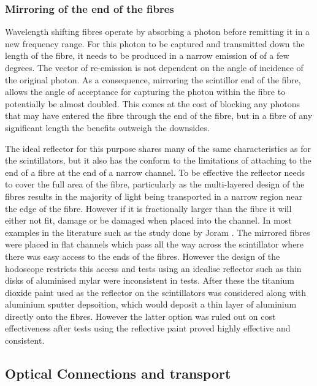 \subsubsection{Mirroring of the end of the fibres}

Wavelength shifting fibres operate by absorbing a photon before remitting it in a new frequency range. For this photon to be captured and transmitted down the length of the fibre, it needs to be produced in a narrow emission of of a few degrees. The vector of re-emission is not dependent on the angle of incidence of the original photon. As a consequence, mirroring the scintillor end of the fibre, allows the angle of acceptance for capturing the photon within the fibre to potentially be almost doubled. This comes at the cost of blocking any photons that may have entered the fibre through the end of the fibre, but in a fibre of any significant length the benefits outweigh the downsides.

The ideal reflector for this purpose shares many of the same characteristics as for the scintillators, but it also has the conform to the limitations of attaching to the end of a fibre at the end of a narrow channel.  To be effective the reflector needs to cover the full area of the fibre, particularly as the multi-layered design of the fibres results in the majority of light being transported in a narrow region near the edge of the fibre. However if it is fractionally larger than the fibre it will either not fit, damage or be damaged when placed into the channel. In most examples in the literature such as the study done by Joram \cite{joram2014mirroring}. The mirrored fibres were placed in flat channels which pass all the way across the scintillator where there was easy access to the ends of the fibres. However the design of the hodoscope restricts this access and tests using an idealise reflector such as thin disks of aluminised mylar were inconsistent in tests. After these the titanium dioxide paint used as the reflector on the scintillators was considered along with aluminium sputter depsoition, which would deposit a thin layer of aluminium directly onto the fibres. However the latter option was ruled out on cost effectiveness after tests using the reflective paint proved highly effective and consistent. 

\cite{joram2014mirroring}
\subsection{Optical Connections and transport}

